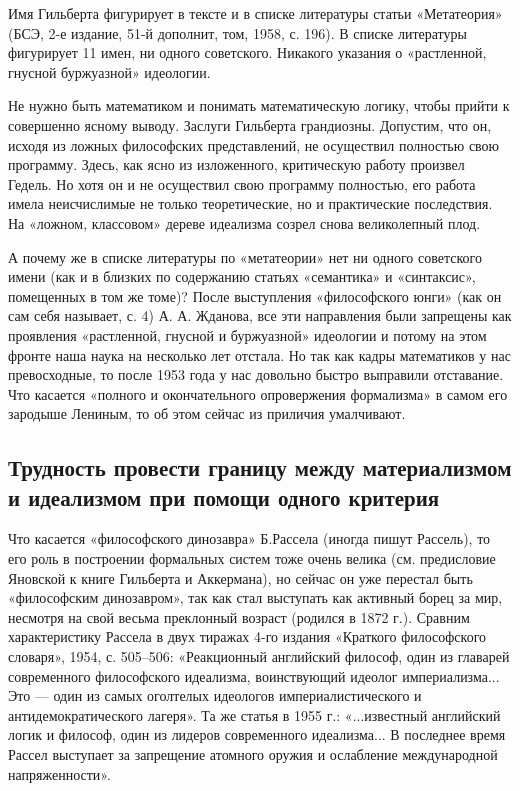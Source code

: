 Имя  Гильберта  фигурирует  в  тексте и  в  списке  литературы  статьи
«Метатеория» (БСЭ, 2-е  издание, 51-й дополнит, том, 1958,  с. 196). В
списке литературы  фигурирует 11 имен, ни  одного советского. Никакого
указания о «растленной, гнусной буржуазной» идеологии.

Не  нужно быть  математиком  и понимать  математическую логику,  чтобы
прийти  к  совершенно  ясному выводу.  Заслуги  Гильберта  грандиозны.
Допустим,  что  он, исходя  из  ложных  философских представлений,  не
осуществил полностью  свою программу. Здесь, как  ясно из изложенного,
критическую  работу  произвел  Гедель.  Но хотя  он  и  не  осуществил
свою  программу полностью,  его  работа имела  неисчислимые не  только
теоретические, но  и практические последствия. На  «ложном, классовом»
дереве идеализма созрел снова великолепный плод.

А  почему  же  в  списке  литературы по  «метатеории»  нет  ни  одного
советского имени  (как и в  близких по содержанию  статьях «семантика»
и  «синтаксис»,   помещенных  в   том  же  томе)?   После  выступления
«философского юнги»  (как он сам себя  называет, с. 4) А.  А. Жданова,
все  эти  направления  были   запрещены  как  проявления  «растленной,
гнусной и  буржуазной» идеологии  и потому на  этом фронте  наша наука
на  несколько  лет  отстала.  Но  так  как  кадры  математиков  у  нас
превосходные,  то после  1953  года у  нас  довольно быстро  выправили
отставание.  Что  касается   «полного  и  окончательного  опровержения
формализма»  в  самом его  зародыше  Лениным,  то  об этом  сейчас  из
приличия умалчивают.

\subsection{Трудность   провести   границу   между   материализмом   и
идеализмом при помощи одного критерия}

Что   касается  «философского   динозавра»  Б.Рассела   (иногда  пишут
Рассель), то его роль в построении формальных систем тоже очень велика
(см. предисловие Яновской к книге Гильберта и Аккермана), но сейчас он
уже перестал быть «философским динозавром», так как стал выступать как
активный  борец за  мир, несмотря  на свой  весьма преклонный  возраст
(родился в  1872 г.).  Сравним характеристику  Рассела в  двух тиражах
4-го  издания  «Краткого  философского словаря»,  1954,  с.  505--506:
«Реакционный  английский   философ,  один  из   главарей  современного
философского  идеализма,  воинствующий   идеолог  империализма...  Это
---   один  из   самых  оголтелых   идеологов  империалистического   и
антидемократического лагеря».  Та же  статья в 1955  г.: «...известный
английский логик и философ,  один из лидеров современного идеализма...
В последнее  время Рассел  выступает за  запрещение атомного  оружия и
ослабление международной напряженности».

